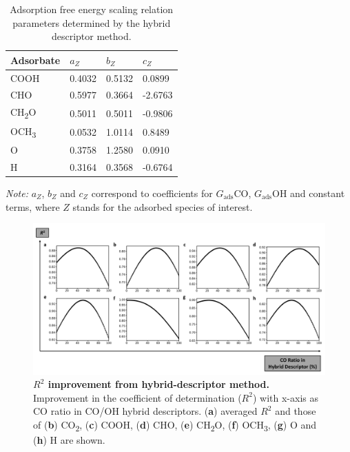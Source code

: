 \documentclass[a4paper, 12pt]{article}
\begin{document}
\begin{table}[htbp]
\label{supp_table13:scaling_params}
  \caption{Adsorption free energy scaling relation parameters
    determined by the hybrid descriptor method.}
  \center
  \small
  \begin{tabularx}{0.75\textwidth}{@{}l *{3}{X} @{}}
    \toprule
    Adsorbate             & $a_Z$   & $b_Z$   & $c_Z$    \\
    \midrule
    COOH                  & 0.4032  & 0.5132  &  0.0899  \\
    CHO                   & 0.5977  & 0.3664  & -2.6763  \\
    CH\textsubscript{2}O  & 0.5011  & 0.5011  & -0.9806  \\
    OCH\textsubscript{3}  & 0.0532  & 1.0114  &  0.8489  \\
    O                     & 0.3758  & 1.2580  &  0.0910  \\
    H                     & 0.3164  & 0.3568  & -0.6764  \\
    \bottomrule
  \end{tabularx}

  \smallskip

  \begin{flushright}
    \begin{minipage}{\textwidth}
      \footnotesize\textit{Note:} $a_{Z}$, $b_{Z}$ and $c_{Z}$ correspond
      to coefficients for $G_{\text{ads}}\text{CO}$, $G_{\text{ads}}\text{OH}$
      and constant terms, where $Z$ stands for the adsorbed species of interest.
  \end{minipage}
  \end{flushright}
\end{table}

\begin{figure}[htbp]
  \centering
  \includegraphics[width=\textwidth]{supp_fig10_r2_hyb_des.png}
  \caption{\textbf{$R^2$ improvement from hybrid-descriptor method.}
  Improvement in the coefficient of determination ($R^2$) with x-axis
  as CO ratio in CO/OH hybrid descriptors.
  (\textbf{a}) averaged $R^2$ and those of (\textbf{b}) CO\textsubscript{2},
  (\textbf{c}) COOH,
  (\textbf{d}) CHO, (\textbf{e}) CH\textsubscript{2}O, (\textbf{f})
  OCH\textsubscript{3}, (\textbf{g}) O and (\textbf{h}) H are shown.}
  \label{supp_fig10:r2_hyb_des}
\end{figure}
\end{document}
